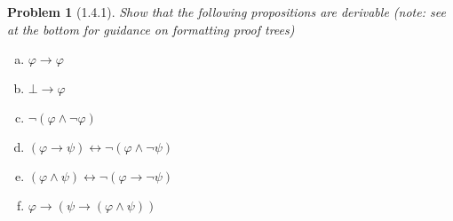 \documentclass[letter]{article}
\newtheorem{problem}{Problem}
\theoremstyle{definition}
\renewcommand{\phi}{\varphi}
\begin{document}
\begin{problem}[1.4.1] Show that the following propositions are derivable (note: see at the bottom for guidance on formatting proof trees)
\begin{enumerate}[(a)]
    \item $\phi \to \phi$
    \item $\bot \to \phi$
    \item $\neg (\phi \land \neg \phi)$
    \item $(\phi \to \psi) \leftrightarrow \neg (\phi \land \neg \psi)$
    \item $(\phi \land \psi) \leftrightarrow \neg (\phi \to \neg \psi)$
    \item $\phi \to (\psi \to (\phi \land \psi))$
\end{enumerate}
\end{problem}
\end{document}
